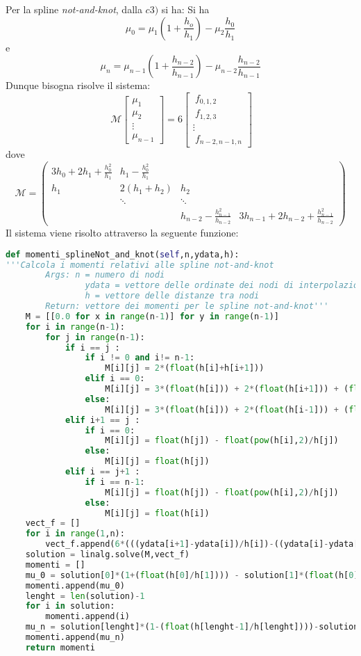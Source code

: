 \documentclass[a4paper,12pt]{report}
\theoremstyle{definition}
\begin{document}
Per la spline \textit{not-and-knot}, dalla $c3)$ si ha:
Si ha $$\mu_0 = \mu_1 \left( 1 + \frac{h_o}{h_1} \right) - \mu_2 \frac{h_0}{h_1}$$ e $$\mu_n = \mu_{n-1} \left( 1 + \frac{h_{n-2}}{h_{n-1}} \right) - \mu_{n-2} \frac{h_{n-2}}{h_{n-1}}$$
Dunque bisogna risolve il sistema:
\begin{displaymath}
\ \mathcal{M}
\left[ \begin{array}{ccc}
\mu_{1} \\
\mu_{2} \\
\vdots \\
\mu_{n-1}
\end{array} \right] = 6
\left[ \begin{array}{ccc}
\ f_{0,1,2} \\
\ f_{1,2,3} \\
\vdots \\
\ f_{n-2,n-1,n}
\end{array} \right]
\end{displaymath}
dove 
\[\mathcal{M} = \left( \begin{array}{cccc}
3h_0+2h_1+\frac{h_0^2}{h_1} & h_1-\frac{h_0^2}{h_1} & & \\
h_1 & 2(h_1+h_2) & h_2 & \\
& \ddots & \ddots &  \\
& & h_{n-2}-\frac{h_{n-1}^2}{h_{n-2}} & 3h_{n-1}+2h_{n-2}+\frac{h_{n-1}^2}{h_{n-2}} 
\end{array} \right) \]
Il sistema viene risolto attraverso la seguente funzione:
\begin{lstlisting}[language=Python]
def momenti_splineNot_and_knot(self,n,ydata,h):
'''Calcola i momenti relativi alle spline not-and-knot
		Args: n = numero di nodi
				ydata = vettore delle ordinate dei nodi di interpolazione
				h = vettore delle distanze tra nodi
		Return: vettore dei momenti per le spline not-and-knot'''
	M = [[0.0 for x in range(n-1)] for y in range(n-1)] 
	for i in range(n-1):
		for j in range(n-1):
			if i == j :
				if i != 0 and i!= n-1:
					M[i][j] = 2*(float(h[i]+h[i+1]))
				elif i == 0:
					M[i][j] = 3*(float(h[i])) + 2*(float(h[i+1])) + (float(					pow(h[i],2)/h[i+1]))
				else:
					M[i][j] = 3*(float(h[i])) + 2*(float(h[i-1])) + (float(					pow(h[i],2)/h[i-1]))
			elif i+1 == j :
				if i == 0:
					M[i][j] = float(h[j]) - float(pow(h[i],2)/h[j])
				else:
					M[i][j] = float(h[j])
			elif i == j+1 :
				if i == n-1:
					M[i][j] = float(h[j]) - float(pow(h[i],2)/h[j])
				else:
					M[i][j] = float(h[i])
	vect_f = []
	for i in range(1,n):
		vect_f.append(6*(((ydata[i+1]-ydata[i])/h[i])-((ydata[i]-ydata[i-1])/h[i-1])))
	solution = linalg.solve(M,vect_f)
	momenti = []
	mu_0 = solution[0]*(1+(float(h[0]/h[1]))) - solution[1]*(float(h[0]/h[1]))
	momenti.append(mu_0)
	lenght = len(solution)-1
	for i in solution:
		momenti.append(i)
	mu_n = solution[lenght]*(1-(float(h[lenght-1]/h[lenght])))-solution[lenght-1]*(float(h[lenght-1]/h[lenght]))
	momenti.append(mu_n)
	return momenti
\end{lstlisting}
\end{document}
